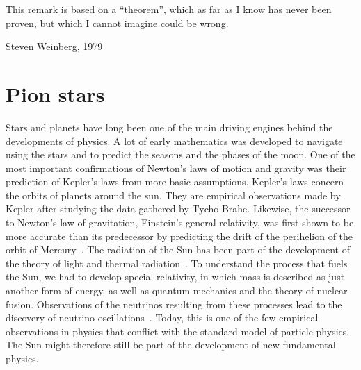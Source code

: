 \epigraph{ 
    This remark is based on a ``theorem'', which as far as I know has never been proven, but which I cannot imagine could be wrong.
}
{
    Steven Weinberg, 1979~\autocite{weinbergPhenomenologicalLagrangians1979a}
}


\section{Pion stars}

Stars and planets have long been one of the main driving engines behind the developments of physics.
A lot of early mathematics was developed to navigate using the stars and to predict the seasons and the phases of the moon.
One of the most important confirmations of Newton's laws of motion and gravity was their prediction of Kepler's laws from more basic assumptions.
Kepler's laws concern the orbits of planets around the sun.
They are empirical observations made by Kepler after studying the data gathered by Tycho Brahe.
Likewise, the successor to Newton's law of gravitation, Einstein's general relativity, was first shown to be more accurate than its predecessor by predicting the drift of the perihelion of the orbit of Mercury~\autocite{carrollSpacetimeGeometryIntroduction2019}.
The radiation of the Sun has been part of the development of the theory of light and thermal radiation~\autocite{hemmerTermiskFysikk2002}.
To understand the process that fuels the Sun, we had to develop special relativity, in which mass is described as just another form of energy, as well as quantum mechanics and the theory of nuclear fusion.
Observations of the neutrinos resulting from these processes lead to the discovery of neutrino oscillations~\autocite{prialnikIntroductionTheoryStellar2000}.
Today, this is one of the few empirical observations in physics that conflict with the standard model of particle physics.
The Sun might therefore still be part of the development of new fundamental physics.

